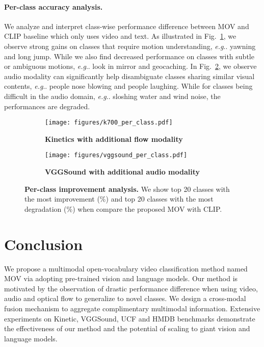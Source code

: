 \documentclass{article}
\makeatletter
\DeclareRobustCommand\onedot{\futurelet\@let@token\@onedot}
\def\@onedot{\ifx\@let@token.\else.\null\fi\xspace}
\def\eg{\emph{e.g}\onedot} \def\Eg{\emph{E.g}\onedot}
\makeatother
\begin{document}
\paragraph{Per-class accuracy analysis.} 
We analyze and interpret class-wise performance difference between MOV and CLIP baseline which only uses video and text. 
As illustrated in Fig.~\ref{fig:k700_per_class}, we observe strong gains on classes that require motion understanding, \eg yawning and long jump. While we also find decreased performance on classes with subtle or ambiguous motions, \eg look in mirror and geocaching. 
In Fig.~\ref{fig:vggsound_per_class}, we observe audio modality can significantly help disambiguate classes sharing similar visual contents, \eg people nose blowing and people laughing. While for classes being difficult in the audio domain, \eg sloshing water and wind noise, the performances are degraded.

\begin{figure}[hbtp]
 \centering
 \begin{subfigure}[b]{0.46\linewidth}
     \centering
     \texttt{[image: figures/k700\_per\_class.pdf]}
     \caption{
     \textbf{Kinetics with additional flow modality}}
     \label{fig:k700_per_class}
 \end{subfigure}
 \hfill
 \begin{subfigure}[b]{0.46\linewidth}
     \centering
     \texttt{[image: figures/vggsound\_per\_class.pdf]}
     \caption{\textbf{VGGSound with additional audio modality}}
     \label{fig:vggsound_per_class}
 \end{subfigure}
    \caption{\textbf{Per-class improvement analysis.} We show top 20 classes with the most improvement (\%) and top 20 classes with the most degradation (\%) when compare the proposed MOV with CLIP.}
\label{fig:per_class_acc}
\end{figure}


\section{Conclusion}
We propose a multimodal open-vocabulary video classification method named MOV via adopting pre-trained vision and language models. Our method is motivated by the observation of drastic performance difference when using video, audio and optical flow to generalize to novel classes. We design a cross-modal fusion mechanism to aggregate complimentary multimodal information. Extensive experiments on Kinetic, VGGSound, UCF and HMDB benchmarks demonstrate the effectiveness of our method and the potential of scaling to giant vision and language models.    
\end{document}
